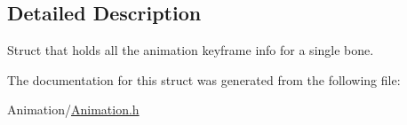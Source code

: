 \subsection{Detailed Description}
Struct that holds all the animation keyframe info for a single bone. 

The documentation for this struct was generated from the following file\+:\begin{DoxyCompactItemize}
\item 
Animation/\hyperlink{Animation_8h}{Animation.\+h}\end{DoxyCompactItemize}
